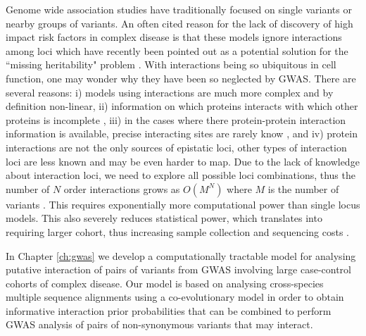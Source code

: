 Genome wide association studies have traditionally focused on single variants or nearby groups of variants. 
An often cited reason for the lack of discovery of high impact risk factors in complex disease is that these models ignore interactions among loci \cite{cordell2009detecting} which have recently been pointed out as a potential solution for the ``missing heritability" problem \cite{zuk2012mystery, zuk2014searching}. 
With interactions being so ubiquitous in cell function, one may wonder why they have been so neglected by GWAS. 
There are several reasons: 
i) models using interactions are much more complex \cite{gao2010classification} and by definition non-linear, 
ii) information on which proteins interacts with which other proteins is incomplete \cite{venkatesan2009empirical}, 
iii) in the cases where there protein-protein interaction information is available, precise interacting sites are rarely know \cite{venkatesan2009empirical}, and
iv) protein interactions are not the only sources of epistatic loci, other types of interaction loci are less known and may be even harder to map.
Due to the lack of knowledge about interaction loci, we need to explore all possible loci combinations, thus the number of $N$ order interactions grows as $O(M^N)$ where $M$ is the number of variants \cite{de2013emerging}.
This requires exponentially more computational power than single locus models.
This also severely reduces statistical power, which translates into requiring larger cohort, thus increasing sample collection and sequencing costs \cite{de2013emerging}.

In Chapter \ref{ch:gwas} we develop a computationally tractable model for analysing putative interaction of pairs of variants from GWAS involving large case-control cohorts of complex disease. 
Our model is based on analysing cross-species multiple sequence alignments using a co-evolutionary model in order to obtain informative interaction prior probabilities that can be combined to perform GWAS analysis of pairs of non-synonymous variants that may interact.
